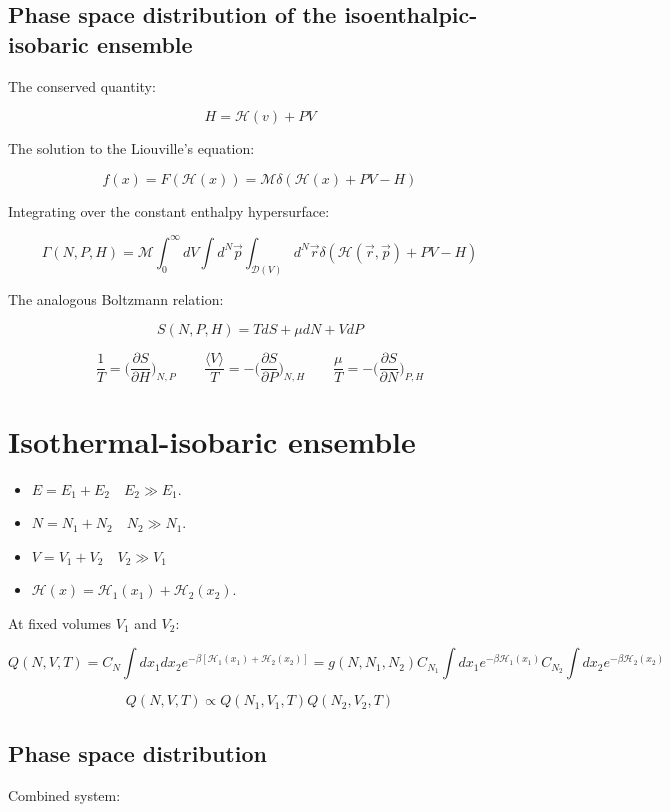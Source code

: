 	\subsection{Phase space distribution of the isoenthalpic-isobaric ensemble}
	The conserved quantity:

	$$H = \mathcal{H}(v) + PV$$

	The solution to the Liouville's equation:

	$$f(x) = F(\mathcal{H}(x)) = \mathcal{M}\delta(\mathcal{H}(x)+PV-H)$$

	Integrating over the constant enthalpy hypersurface:

	$$\Gamma(N, P, H) = \mathcal{M}\int_0^{\infty}dV\int d^N\vec{p}\int_{\mathcal{D}(V)}d^N\vec{r}\delta(\mathcal{H}(\vec{r}, \vec{p}) + PV-H)$$

	The analogous Boltzmann relation:

	$$S(N, P, H) = TdS + \mu dN + VdP$$

	$$\frac{1}{T} = \biggl(\frac{\partial S}{\partial H}\biggr)_{N, P}\qquad \frac{\langle V\rangle}{T} = -\biggl(\frac{\partial S}{\partial P}\biggr)_{N, H}\qquad \frac{\mu}{T} = -\biggl(\frac{\partial S}{\partial N}\biggr)_{P, H}$$

\section{Isothermal-isobaric ensemble}

\begin{multicols}{2}
	\begin{itemize}
		\item $E = E_1 + E_2\quad E_2\gg E_1$.
		\item $N = N_1 + N_2\quad N_2\gg N_1$.
		\item $V = V_1 + V_2\quad V_2\gg V_1$
		\item $\mathcal{H}(x) = \mathcal{H}_1(x_1) + \mathcal{H}_2(x_2)$.
	\end{itemize}
\end{multicols}

At fixed volumes $V_1$ and $V_2$:

$$Q(N, V, T) = C_N\int dx_1dx_2 e^{-\beta[\mathcal{H}_1(x_1) + \mathcal{H}_2(x_2)]} = g(N, N_1, N_2)C_{N_1}\int dx_1 e^{-\beta\mathcal{H}_1(x_1)}C_{N_2}\int dx_2 e^{-\beta\mathcal{H}_2(x_2)}$$

$$Q(N, V, T) \propto Q(N_1, V_1, T)Q(N_2, V_2, T)$$

	\subsection{Phase space distribution}
	Combined system:

